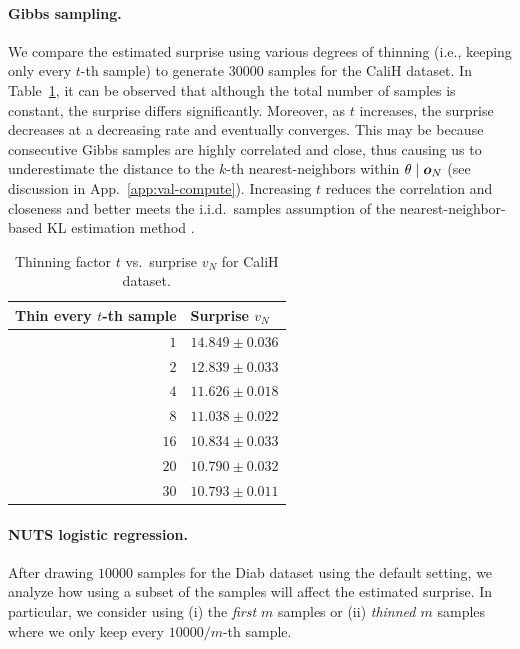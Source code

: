 \documentclass{article}
\theoremstyle{plain}
\theoremstyle{definition}
\theoremstyle{remark}
\begin{document}
\paragraph{Gibbs sampling.}
We compare the estimated surprise using various degrees of thinning (i.e., keeping only every $t$-th sample) to generate $30000$ samples for the CaliH dataset.
In Table~\ref{tab:num-thin-calih}, it can be observed that although the total number of samples is constant, the surprise differs significantly.
Moreover, as $t$ increases, the surprise decreases at a decreasing rate and eventually converges.
This may be because consecutive Gibbs samples are highly correlated and close, thus causing us to underestimate the distance to the $k$-th nearest-neighbors within $\theta\mid{\bm{o}}_N$ (see discussion in App.~\ref{app:val-compute}). Increasing $t$ reduces the correlation and closeness and better meets the i.i.d.~samples assumption of the nearest-neighbor-based KL estimation method \cite{perez2008kl}.

\begin{table}[H]
\centering
\begin{tabular}{@{}rl@{}}
\toprule
Thin every $t$-th sample & Surprise $v_N$         \\ \midrule
$1$      & $14.849 \pm 0.036$ \\
$2$    & $12.839 \pm 0.033$ \\
$4$      & $11.626 \pm 0.018$ \\
$8$    & $11.038\pm 0.022$ \\
$16$      & $10.834 \pm 0.033$ \\
$20$    & $10.790 \pm 0.032$ \\
$30$   & $10.793 \pm 0.011$ \\ 
\bottomrule
\end{tabular}
\caption{Thinning factor $t$ vs.~surprise $v_N$ for CaliH dataset.}
\label{tab:num-thin-calih}
\end{table}

\paragraph{NUTS logistic regression.}

After drawing $10000$ samples for the Diab dataset using the default setting, we analyze how using a subset of the samples will affect the estimated surprise.
In particular, we consider using (i) the \emph{first $m$} samples or (ii) \emph{thinned $m$} samples where we only keep every $10000/m$-th sample.
\end{document}
